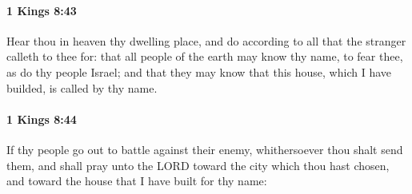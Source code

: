 		\paragraph{1 Kings 8:43} %
			\label{1KINGS-8-43}

			Hear thou in heaven thy dwelling place, and do according to all that the stranger calleth to thee for: that all people of the earth may know thy name, to fear thee, as do thy people Israel; and that they may know that this house, which I have builded, is called by thy name.


		\paragraph{1 Kings 8:44} %
			\label{1KINGS-8-44}

			If thy people go out to battle against their enemy, whithersoever thou shalt send them, and shall pray unto the LORD toward the city which thou hast chosen, and toward the house that I have built for thy name:

